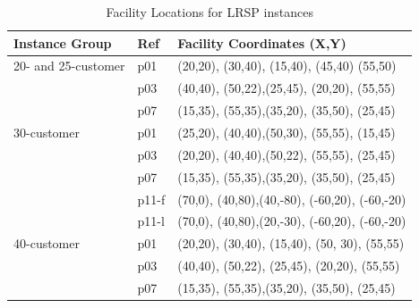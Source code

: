\begin {table}[h]
\begin{center}
\caption {Facility Locations for LRSP instances} \label{FacLocdata}
\begin {tabular}[h]{|l|l|l|} \hline
Instance Group & Ref & Facility Coordinates (X,Y) \\\hline
20- and 25-customer   & p01 &   (20,20), (30,40), (15,40), (45,40) (55,50) \\
\mbox{} &   p03   & (40,40), (50,22),(25,45), (20,20),  (55,55)  \\
\mbox{} &   p07   & (15,35), (55,35),(35,20), (35,50), (25,45)   \\\hline
30-customer &   p01   & (25,20), (40,40),(50,30), (55,55), (15,45)   \\
\mbox{} &   p03   & (20,20), (40,40),(50,22), (55,55), (25,45)    \\
\mbox{} &   p07   & (15,35), (55,35),(35,20), (35,50), (25,45)     \\
\mbox{} &   p11-f & (70,0), (40,80),(40,-80), (-60,20), (-60,-20) \\
\mbox{} &   p11-l & (70,0), (40,80),(20,-30), (-60,20), (-60,-20) \\\hline
40-customer &   p01   & (20,20), (30,40), (15,40), (50, 30), (55,55)  \\
\mbox{} &   p03   & (40,40), (50,22), (25,45), (20,20), (55,55)  \\
\mbox{} &   p07   & (15,35), (55,35),(35,20), (35,50), (25,45)  \\\hline
\end{tabular}
\end{center}
\end{table}

